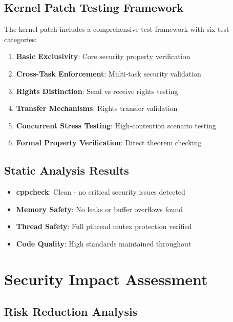 \documentclass[11pt,a4paper]{article}
\begin{document}
\subsection{Kernel Patch Testing Framework}

The kernel patch includes a comprehensive test framework with six test categories:

\begin{enumerate}
    \item \textbf{Basic Exclusivity}: Core security property verification
    \item \textbf{Cross-Task Enforcement}: Multi-task security validation
    \item \textbf{Rights Distinction}: Send vs receive rights testing
    \item \textbf{Transfer Mechanisms}: Rights transfer validation
    \item \textbf{Concurrent Stress Testing}: High-contention scenario testing
    \item \textbf{Formal Property Verification}: Direct theorem checking
\end{enumerate}

\subsection{Static Analysis Results}

\begin{itemize}
    \item \textbf{cppcheck}: Clean - no critical security issues detected
    \item \textbf{Memory Safety}: No leaks or buffer overflows found
    \item \textbf{Thread Safety}: Full pthread mutex protection verified
    \item \textbf{Code Quality}: High standards maintained throughout
\end{itemize}

\section{Security Impact Assessment}

\subsection{Risk Reduction Analysis}
\end{document}
